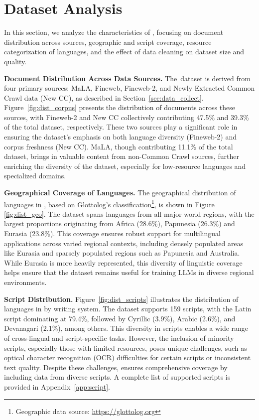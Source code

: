 \section{Dataset Analysis}
\label{sec:analysis}

% 

In this section, we analyze the characteristics of \dcad, focusing on document distribution across sources, geographic and script coverage, resource categorization of languages, and the effect of data cleaning on dataset size and quality.

\noindent\textbf{Document Distribution Across Data Sources.}
The~\dcad dataset is derived from four primary sources: MaLA, Fineweb, Fineweb-2, and Newly Extracted Common Crawl data (New CC), as described in Section~\ref{sec:data_collect}.
Figure~\ref{fig:dist_corpus} presents the distribution of documents across these sources, with Fineweb-2 and New CC collectively contributing 47.5\% and 39.3\% of the total dataset, respectively.
These two sources play a significant role in ensuring the dataset's emphasis on both language diversity (Fineweb-2) and corpus freshness (New CC).
MaLA, though contributing 11.1\% of the total dataset, brings in valuable content from non-Common Crawl sources, further enriching the diversity of the dataset, especially for low-resource languages and specialized domains.

\noindent\textbf{Geographical Coverage of Languages.}
The geographical distribution of languages in \dcad, based on Glottolog’s classification\footnote{Geographic data source: \url{https://glottolog.org}}, is shown in Figure \ref{fig:dist_geo}.
The dataset spans languages from all major world regions, with the largest proportions originating from Africa (28.6\%), Papunesia (26.3\%) and Eurasia (23.8\%).
This coverage ensures robust support for multilingual applications across varied regional contexts, including densely populated areas like Eurasia and sparsely populated regions such as Papunesia and Australia.
While Eurasia is more heavily represented, this diversity of linguistic coverage helps ensure that the dataset remains useful for training LLMs in diverse regional environments.

\noindent\textbf{Script Distribution.}
Figure~\ref{fig:dist_scripts} illustrates the distribution of languages in \dcad by writing system.
The dataset supports 159 scripts, with the Latin script dominating at 79.4\%, followed by Cyrillic (3.9\%), Arabic (2.6\%), and Devanagari (2.1\%), among others.
This diversity in scripts enables a wide range of cross-lingual and script-specific tasks.
However, the inclusion of minority scripts, especially those with limited resources, poses unique challenges, such as optical character recognition (OCR) difficulties for certain scripts or inconsistent text quality.
Despite these challenges, \dcad ensures comprehensive coverage by including data from diverse scripts.
A complete list of supported scripts is provided in Appendix~\ref{app:script}.

